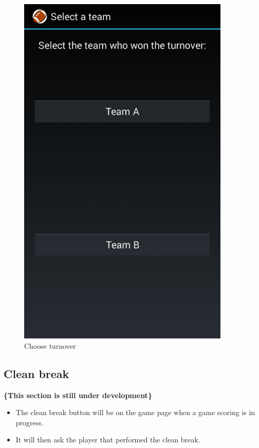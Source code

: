 \documentclass[hidelinks,a4paper,12pt]{article}
\begin{document}
		\begin{figure}[!htb]
  		\centering
  			\begin{minipage}[b]{0.4\textwidth}
    			\includegraphics[width=0.9\textwidth]{./images/choose_turnover.png}
    			\caption{Choose turnover}
  			\end{minipage}
  		\hfill
		\end{figure}

	\subsection{Clean break}
	{\bfseries\{This section is still under development\}}
		\begin{itemize}
			\item The clean break button will be on the game page when a game scoring is in progress.
			\item It will then ask the player that performed the clean break.
		\end{itemize}
\end{document}
